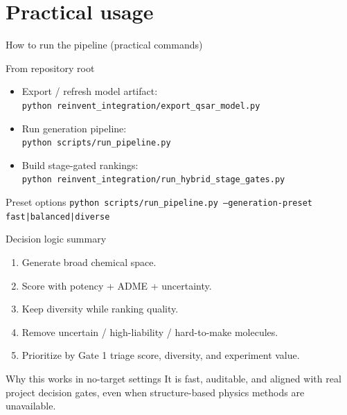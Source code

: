 \documentclass[aspectratio=169,10pt]{beamer}
\begin{document}
\section{Practical usage}

\begin{frame}{How to run the pipeline (practical commands)}
  \begin{block}{From repository root}
    \begin{itemize}
      \item Export / refresh model artifact:\\
            {\scriptsize\texttt{python reinvent\_integration/export\_qsar\_model.py}}
      \item Run generation pipeline:\\
            {\scriptsize\texttt{python scripts/run\_pipeline.py}}
      \item Build stage-gated rankings:\\
            {\scriptsize\texttt{python reinvent\_integration/run\_hybrid\_stage\_gates.py}}
    \end{itemize}
  \end{block}

  \begin{exampleblock}{Preset options}
    {\scriptsize\texttt{python scripts/run\_pipeline.py --generation-preset fast|balanced|diverse}}
  \end{exampleblock}
\end{frame}

\begin{frame}{Decision logic summary}
  \begin{enumerate}
    \item Generate broad chemical space.
    \item Score with potency + ADME + uncertainty.
    \item Keep diversity while ranking quality.
    \item Remove uncertain / high-liability / hard-to-make molecules.
    \item Prioritize by Gate 1 triage score, diversity, and experiment value.
  \end{enumerate}

  \vspace{6pt}
  \begin{alertblock}{Why this works in no-target settings}
    It is fast, auditable, and aligned with real project decision gates,
    even when structure-based physics methods are unavailable.
  \end{alertblock}
\end{frame}
\end{document}

